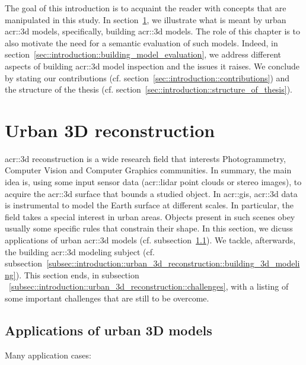 \minitoc

\phantom{M}

The goal of this introduction is to acquaint the reader with concepts that are manipulated in this study.
In section~\ref{sec::introduction::urban_3d_reconstruction}, we illustrate what is meant by urban \gls{acr::3d} models, specifically,  building \gls{acr::3d} models.
The role of this chapter is to also motivate the need for a semantic evaluation of such models.
Indeed, in section~\ref{sec::introduction::building_model_evaluation}, we address different aspects of building \gls{acr::3d} model inspection and the issues it raises.
We conclude by stating our contributions (cf. section~\ref{sec::introduction::contributions}) and the structure of the thesis (cf. section~\ref{sec::introduction::structure_of_thesis}).

\section{Urban 3D reconstruction}
    \label{sec::introduction::urban_3d_reconstruction}
    \gls{acr::3d} reconstruction is a wide research field that interests Photogrammetry, Computer Vision and Computer Graphics communities.
    In summary, the main idea is, using some input sensor data (\gls{acr::lidar} point clouds or stereo images), to acquire the \gls{acr::3d} surface that bounds a studied object.
    In \gls{acr::gis}, \gls{acr::3d} data is instrumental to model the Earth surface at different scales.
    In particular, the field takes a special interest in urban areas.
    Objects present in such scenes obey usually some specific rules that constrain their shape.
    In this section, we dicuss applications of urban \gls{acr::3d} models (cf. subsection~\ref{subsec::introduction::urban_3d_reconstruction::applications}).
    We tackle, afterwards, the  building \gls{acr::3d} modeling subject (cf. subsection~\ref{subsec::introduction::urban_3d_reconstruction::building_3d_modeling}).
    This section ends, in subsection ~\ref{subsec::introduction::urban_3d_reconstruction::challenges}, with a listing of some important challenges that are still to be overcome.
    
    \subsection{Applications of urban 3D models}
        \label{subsec::introduction::urban_3d_reconstruction::applications}
        Many application cases:
